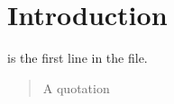 \documentclass{article}
\begin{document}
\section{Introduction}
 is the first line in the file.

\begin{quote}
A quotation
\end{quote}
\end{document}
